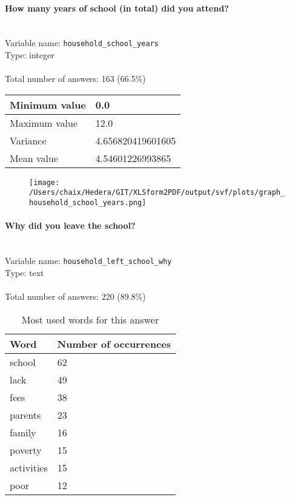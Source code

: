 \documentclass[11.5pt, a4paper]{scrartcl}
\begin{document}
\paragraph{How many years of school (in total) did you attend?}
\  \\Variable name: \texttt{household\_school\_years}\\
Type: integer\\
\\Total number of answers: 163 (66.5\%)
\\[0.2em] \begin{tabular}{p{4cm}|p{8cm}}
Minimum value &0.0 \\
\hline
\cellcolor{mygray} Maximum value & \cellcolor{mygray}12.0 \\
\hline
Variance &4.656820419601605 \\
\hline
\cellcolor{mygray} Mean value & \cellcolor{mygray}4.54601226993865 \\
\hline
\end{tabular}
\begin{figure}[H]
\centering
\texttt{[image: /Users/chaix/Hedera/GIT/XLSform2PDF/output/svf/plots/graph\_household\_school\_years.png]}
\end{figure}
\paragraph{Why did you leave the school?}
\  \\Variable name: \texttt{household\_left\_school\_why}\\
Type: text\\
\\Total number of answers: 220 (89.8\%)
\\[0.2em]\begin{table}[H]
 \begin{tabular}{p{4cm}|p{8cm}}
Word & Number of occurrences  \\
\hline
\cellcolor{mygray}school&\cellcolor{mygray}62\\
\hline
lack&49\\
\hline
\cellcolor{mygray}fees&\cellcolor{mygray}38\\
\hline
parents&23\\
\hline
\cellcolor{mygray}family&\cellcolor{mygray}16\\
\hline
poverty&15\\
\hline
\cellcolor{mygray}activities&\cellcolor{mygray}15\\
\hline
poor&12\\
\hline
\end{tabular}
\caption{\label{tab:table-name} Most used words for this answer}
\end{table}
\end{document}

